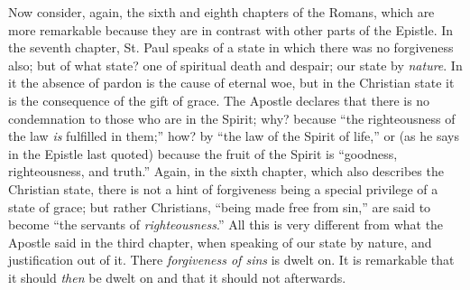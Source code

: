 Now consider, again, the sixth and eighth chapters of the Romans,
which are more remarkable because they are in contrast with other
parts of the Epistle. In the seventh chapter, St. Paul speaks of a
state in which there was no forgiveness also; but of what state? one
of spiritual death and despair; our state by \emph{nature}. In it the
absence of pardon is the cause of eternal woe, but in the Christian
state it is the consequence of the gift of grace. The Apostle declares
that there is no condemnation to those who are in the Spirit; why?
because ``the righteousness of the law \emph{is} fulfilled in them;''
how? by ``the law of the Spirit of life,'' or (as he says in
the Epistle last quoted) because the fruit of the Spirit is
``goodness, righteousness, and truth.'' Again, in the sixth
chapter, which also describes the Christian state, there is not a hint
of forgiveness being a special privilege of a state of grace; but
rather Christians, ``being made free from sin,'' are said to
become ``the servants of \emph{righteousness}.'' All this is
very different from what the Apostle said in the third chapter, when
speaking of our state by nature, and justification out of it. There \emph{forgiveness
of sins} is dwelt on. It is remarkable that it should \emph{then}
be dwelt on and that it should not afterwards.

